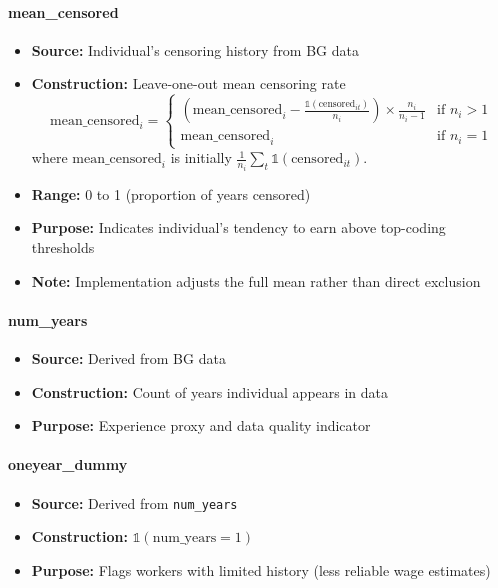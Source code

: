 \documentclass{article}
\begin{document}
\paragraph{mean\_censored}
\begin{itemize}
    \item \textbf{Source:} Individual's censoring history from BG data
    \item \textbf{Construction:} Leave-one-out mean censoring rate
    \begin{equation}
        \text{mean\_censored}_i = \begin{cases}
            (\text{mean\_censored}_i - \frac{\mathbb{1}(\text{censored}_{it})}{n_i}) \times \frac{n_i}{n_i-1} & \text{if } n_i > 1\\
            \text{mean\_censored}_i & \text{if } n_i = 1
        \end{cases}
    \end{equation}
    where $\text{mean\_censored}_i$ is initially $\frac{1}{n_i}\sum_t \mathbb{1}(\text{censored}_{it})$.
    \item \textbf{Range:} 0 to 1 (proportion of years censored)
    \item \textbf{Purpose:} Indicates individual's tendency to earn above top-coding thresholds
    \item \textbf{Note:} Implementation adjusts the full mean rather than direct exclusion
\end{itemize}

\paragraph{num\_years}
\begin{itemize}
    \item \textbf{Source:} Derived from BG data
    \item \textbf{Construction:} Count of years individual appears in data
    \item \textbf{Purpose:} Experience proxy and data quality indicator
\end{itemize}

\paragraph{oneyear\_dummy}
\begin{itemize}
    \item \textbf{Source:} Derived from \texttt{num\_years}
    \item \textbf{Construction:} $\mathbb{1}(\text{num\_years} = 1)$
    \item \textbf{Purpose:} Flags workers with limited history (less reliable wage estimates)
\end{itemize}
\end{document}
